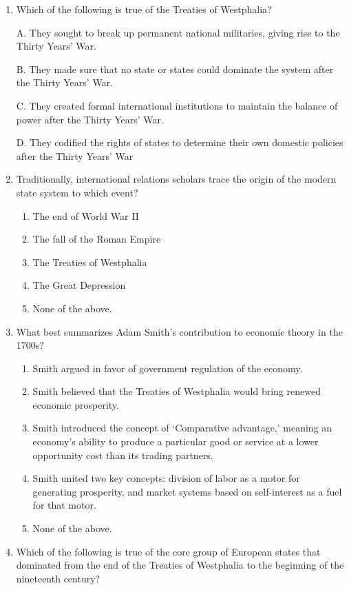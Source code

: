 \documentclass[
]{book}
\begin{document}
\begin{enumerate}
\def\labelenumi{\arabic{enumi}.}
\item
  Which of the following is true of the Treaties of Westphalia?

  A. They sought to break up permanent national militaries, giving rise to the Thirty Years' War.

  B. They made sure that no state or states could dominate the system after the Thirty Years' War.

  C. They created formal international institutions to maintain the balance of power after the Thirty Years' War.

  D. They codified the rights of states to determine their own domestic policies after the Thirty Years' War
\item
  Traditionally, international relations scholars trace the origin of the modern state system to which event?

  \begin{enumerate}
  \def\labelenumii{\Alph{enumii}.}
  \item
    The end of World War II
  \item
    The fall of the Roman Empire
  \item
    The Treaties of Westphalia
  \item
    The Great Depression
  \item
    None of the above.
  \end{enumerate}
\item
  What best summarizes Adam Smith's contribution to economic theory in the 1700s?

  \begin{enumerate}
  \def\labelenumii{\Alph{enumii}.}
  \item
    Smith argued in favor of government regulation of the economy.
  \item
    Smith believed that the Treaties of Westphalia would bring renewed economic prosperity.
  \item
    Smith introduced the concept of `Comparative advantage,' meaning an economy's ability to produce a particular good or service at a lower opportunity cost than its trading partners.
  \item
    Smith united two key concepts: division of labor as a motor for generating prosperity, and market systems based on self-interest as a fuel for that motor.
  \item
    None of the above.
  \end{enumerate}
\item
  Which of the following is true of the core group of European states that dominated from the end of the Treaties of Westphalia to the beginning of the nineteenth century?


\end{enumerate}
\end{document}
